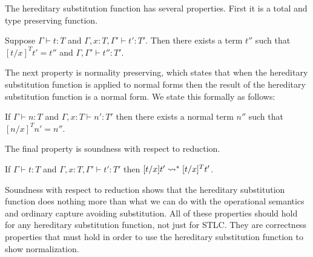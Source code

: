 The hereditary substitution function has several properties.  First
it is a total and type preserving function.
\begin{lemma}
  \label{lemma:total}
  Suppose $\Gamma \vdash t : T$ and $\Gamma, x:T, \Gamma' \vdash t':T'$. Then
  there exists a term $t''$ such that $[t/x]^T t' = t''$ and $\Gamma,\Gamma' \vdash t'':T'$.
\end{lemma}
\noindent
The next property is normality preserving, which states that when the
hereditary substitution function is applied to normal forms then the
result of the hereditary substitution function is a normal form.  We state
this formally as follows:
\begin{lemma}
  \label{corollary:normalization_preserving}
  If $\Gamma \vdash n:T$ and $\Gamma, x:T \vdash n':T'$ then there exists a normal term $n''$ 
  such that $[n/x]^T n' = n''$.
\end{lemma}
\noindent
The final property is soundness with respect to reduction. 
\begin{lemma}
  \label{lemma:soundness_reduction}
  If $\Gamma \vdash t : T$ and $\Gamma, x:T, \Gamma' \vdash t':T'$ then
  $[t/x]t' \rightsquigarrow^* [t/x]^T t'$.
\end{lemma}
\noindent
Soundness with respect to reduction shows that the hereditary
substitution function does nothing more than what we can do with the
operational semantics and ordinary capture avoiding substitution.  All
of these properties should hold for any hereditary substitution
function, not just for STLC.  They are correctness properties that must
hold in order to use the hereditary substitution function to show
normalization.

